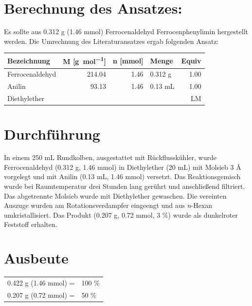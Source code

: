 \documentclass[12pt]{article}
\begin{document}
\begin{onehalfspace}

\section{Berechnung des Ansatzes: }
Es sollte aus 0.312 g (1.46 \si{\milli\mol}) Ferrocenaldehyd Ferrocenphenylimin hergestellt werden.
Die Umrechnung des Literaturansatzes\cite{durch} ergab folgenden Ansatz:\\[0.5cm]
\begin{tabular}{lrrlr}
\toprule
\textbf{Bezeichnung}&\textbf{ M [\si{\gram\per\mol}]} & \textbf{n [\si{\milli\mol}]} & \textbf{Menge} & \textbf{Equiv}\\
\midrule
Ferrocenaldehyd & 214.04 & 1.46  &  0.312 \si{\gram} &1.00   \\
Anilin          & 93.13  & 1.46  &  0.13 \si{\milli\liter} & 1.00  \\
Diethylether    &  &  &  & LM   \\
\bottomrule
\end{tabular}


\normalsize \section{Durchführung \cite{durch}}
In einem 250 \si{\milli\liter} Rundkolben, ausgestattet mit Rückflusskühler, wurde Ferrocenaldehyd (0.312 g, 1.46 \si{\milli\mol}) in Diethylether (20 \si{\milli\liter}) mit Molsieb 3 \si{\angstrom} vorgelegt und mit Anilin (0.13 \si{\milli\liter}, 1.46 \si{\milli\mol}) versetzt. Das Reaktionsgemisch wurde bei Raumtemperatur drei Stunden lang gerührt und anschließend filtriert. Das abgetrennte Molsieb wurde mit Diethylether gewaschen. Die vereinten Auszuge wurden am Rotationsverdampfer eingeengt und aus \textit{n}-Hexan umkristallisiert. Das Produkt (0.207 \si{\gram}, 0.72 \si{\milli\mol}, 3 \%) wurde als dunkelroter Feststoff erhalten.

\section{Ausbeute}
\begin{tabular}{ll}
  0.422 \si{\gram} (1.46 \si{\milli\mol}) =  & 100 \%\\
  0.207 \si{\gram} (0.72 \si{\milli\mol}) =  & 50 \%  \\
\end{tabular}

\end{onehalfspace}
\end{document}
